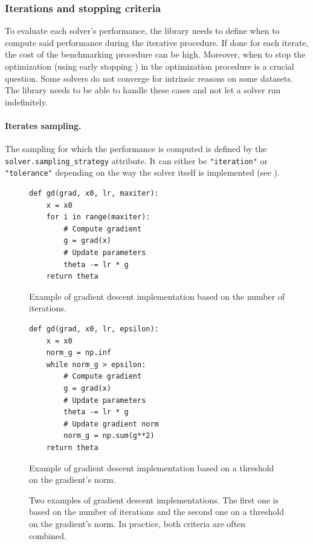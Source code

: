 \subsubsection{Iterations and stopping criteria}

To evaluate each solver's performance, the library needs to define when to compute said performance during the iterative procedure.
If done for each iterate, the cost of the benchmarking procedure can be high.
Moreover, when to stop the optimization (using early stopping \citep{prechelt2002early}) in the optimization procedure is a crucial question.
Some solvers do not converge for intrinsic reasons on some datasets.
The library needs to be able to handle these cases and not let a solver run indefinitely.

\paragraph{Iterates sampling.}
The sampling for which the performance is computed is defined by the \texttt{solver.sampling\_strategy} attribute.
It can either be \texttt{"iteration"} or \texttt{"tolerance"} depending on the way the solver itself is implemented (see ).

\begin{figure}[htbp]
    \centering
    \begin{minipage}[t]{0.45\textwidth}
        \begin{verbatim}
def gd(grad, x0, lr, maxiter):
    x = x0
    for i in range(maxiter):
        # Compute gradient
        g = grad(x)
        # Update parameters
        theta -= lr * g
    return theta
        \end{verbatim}
        \caption*{Example of gradient descent implementation based on the number of iterations.}
    \end{minipage}
    \hfill
    \begin{minipage}[t]{0.45\textwidth}
        \begin{verbatim}
def gd(grad, x0, lr, epsilon):
    x = x0
    norm_g = np.inf
    while norm_g > epsilon:
        # Compute gradient
        g = grad(x)
        # Update parameters
        theta -= lr * g
        # Update gradient norm
        norm_g = np.sum(g**2)
    return theta
        \end{verbatim}
        \caption*{Example of gradient descent implementation based on a threshold on the gradient's norm.}
    \end{minipage}
    \caption{Two examples of gradient descent implementations. The first one is based on the number of iterations and the second one on a threshold on the gradient's norm. In practice, both criteria are often combined.}
    \label{fig:implementation}
\end{figure}


